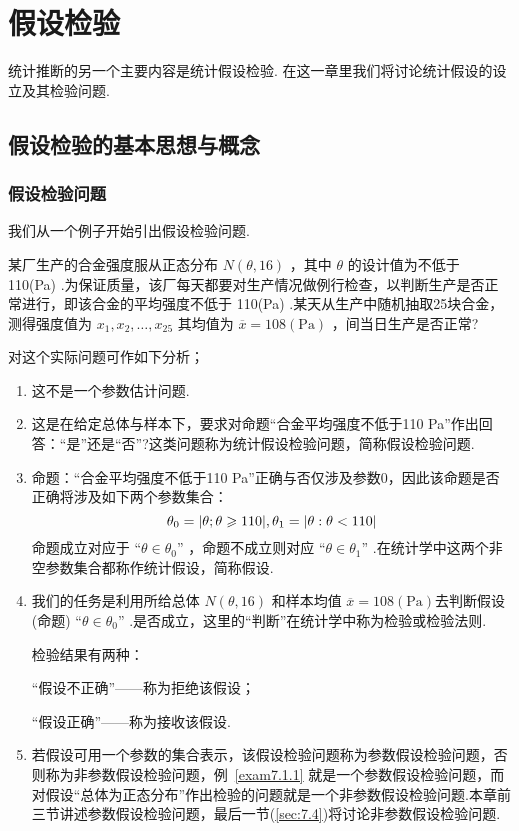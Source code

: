 \chapter{假设检验\label{cha:7}}
统计推断的另一个主要内容是统计假设检验. 在这一章里我们将讨论统计假设的设立及其检验问题.

\section{假设检验的基本思想与概念\label{sec:7.1}}
\subsection{假设检验问题\label{7.1.1}}
我们从一个例子开始引出假设检验问题.
\begin{example}\label{exam7.1.1}
某厂生产的合金强度服从正态分布 $N(\theta,16)$ ，其中 $\theta$ 的设计值为不低于 110(Pa) .为保证质量，该厂每天都要对生产情况做例行检查，以判断生产是否正常进行，即该合金的平均强度不低于 110(Pa) .某天从生产中随机抽取25块合金，测得强度值为 $x_{1},x_{2},\dotsc,x_{25}$ 其均值为 $\overline{x}=108(\mathrm {Pa})$ ，间当日生产是否正常?

对这个实际问题可作如下分析；
\begin{enumerate}
	\item 这不是一个参数估计问题.
	
	\item 这是在给定总体与样本下，要求对命题“合金平均强度不低于110 Pa”作出回答：“是”还是“否”?这类问题称为统计假设检验问题，简称假设检验问题.
	
	\item 命题：“合金平均强度不低于110 Pa”正确与否仅涉及参数0，因此该命题是否正确将涉及如下两个参数集合：
	\[
	\theta_0=\left|\theta ;\theta\geq 110\right|,\\\theta_1=\left|\theta :\theta <110\right|
	\]
	命题成立对应于 “$\theta\in\theta_0$” ，命题不成立则对应 “$\theta\in\theta_1$” .在统计学中这两个非空参数集合都称作统计假设，简称假设.
	\item 我们的任务是利用所给总体 $N(\theta,16)$ 和样本均值 $\overline{x}=108(\mathrm {Pa})$去判断假设(命题) “$\theta\in\theta_0$” .是否成立，这里的“判断”在统计学中称为检验或检验法则.
	
	检验结果有两种：
	\begin{center}
		“假设不正确”——称为拒绝该假设；
		
		“假设正确”——称为接收该假设.
	\end{center}
	\item 若假设可用一个参数的集合表示，该假设检验问题称为参数假设检验问题，否则称为非参数假设检验问题，例~\ref{exam7.1.1} 就是一个参数假设检验问题，而对假设“总体为正态分布”作出检验的问题就是一个非参数假设检验问题.本章前三节讲述参数假设检验问题，最后一节(\ref{sec:7.4})将讨论非参数假设检验问题.
\end{enumerate}

\end{example}

